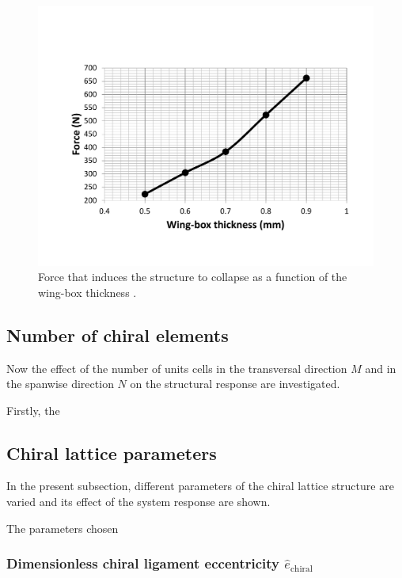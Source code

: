     \begin{figure}[!htpb] %
      \centering
      \includegraphics[width=0.8 \textwidth]{../figures/result-sim/cbox/force_cbox_t}
      \caption[Force that induces the structure to collapse as a function of the wing-box thickness]{Force that induces the structure to collapse as a function of the wing-box thickness \boxt.}\label{fig:force_cbox_t}
    \end{figure}

  \clearpage
  \subsection{Number of chiral elements} \label{subsec:MandN_para}

    Now the effect of the number of units cells in the transversal direction $M$ and in the spanwise direction $N$ on the structural response are investigated.

    Firstly, the



  \clearpage
  \subsection{Chiral lattice parameters} \label{subsec:chiral_para}

    In the present subsection, different parameters of the chiral lattice structure are varied and its effect of the system response are shown. 

    The parameters chosen 

    \subsubsection{Dimensionless chiral ligament eccentricity $\hat{e}_{\mathrm{chiral}}$}


